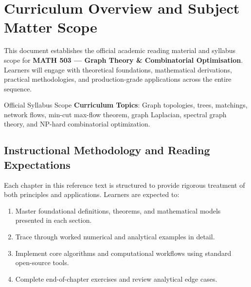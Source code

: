 \section{Curriculum Overview and Subject Matter Scope}

This document establishes the official academic reading material and syllabus scope for \textbf{MATH 503 --- Graph Theory \& Combinatorial Optimisation}. Learners will engage with theoretical foundations, mathematical derivations, practical methodologies, and production-grade applications across the entire sequence.

\begin{InsightBox}{Official Syllabus Scope}
  \textbf{Curriculum Topics}: Graph topologies, trees, matchings, network flows, min-cut max-flow theorem, graph Laplacian, spectral graph theory, and NP-hard combinatorial optimization.
\end{InsightBox}

\subsection{Instructional Methodology and Reading Expectations}

Each chapter in this reference text is structured to provide rigorous treatment of both principles and applications. Learners are expected to:
\begin{enumerate}
  \item Master foundational definitions, theorems, and mathematical models presented in each section.
  \item Trace through worked numerical and analytical examples in detail.
  \item Implement core algorithms and computational workflows using standard open-source tools.
  \item Complete end-of-chapter exercises and review analytical edge cases.
\end{enumerate}

